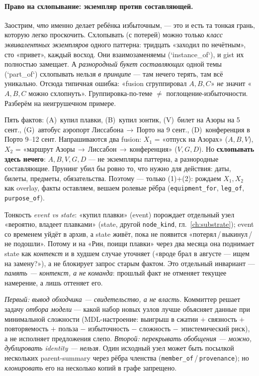 \paragraph{Право на схлопывание: экземпляр против составляющей.} Заострим, \emph{что}
именно делает ребёнка избыточным, — это и есть та тонкая грань, которую легко
проскочить. Схлопывать (с потерей) можно только \emph{класс эквивалентных экземпляров}
одного паттерна: тридцать «заходил по нечётным», сто «привет», каждый восход. Они
взаимозаменяемы (`instance\_of`), и gist их полностью замещает. А \emph{разнородный
букет составляющих} одной темы (`part\_of`) схлопывать нельзя \emph{в принципе} — там
нечего терять, там всё уникально. Отсюда типичная ошибка: «fusion сгруппировал
$A,B,C$» \emph{не} значит «$A,B,C$ можно схлопнуть». Группировка-по-теме $\ne$
поглощение-избыточности. Разберём на неигрушечном примере.

\begin{workedbox}
Пять фактов: (A)~купил плавки, (B)~купил зонтик, (V)~билет на Азоры на 5 сент.,
(G)~автобус аэропорт Лиссабона\,$\to$\,Порто на 9 сент., (D)~конференция в Порто
9--12 сент. Напрашиваются два fusion: $X_1$ = «отпуск на Азорах» ($A,B,V$),
$X_2$ = «маршрут Азоры\,$\to$\,Лиссабон\,$\to$\,конференция» ($V,G,D$). Но
\textbf{схлопывать здесь нечего}: $A,B,V,G,D$ — не экземпляры паттерна, а разнородные
составляющие. Прунинг убил бы ровно то, что нужно для действия: даты, билеты,
предметы, обязательства. Поэтому — только (1)+(2): рождаем $X_1,X_2$ как overlay,
факты оставляем, вешаем ролевые рёбра (\texttt{equipment\_for}, \texttt{leg\_of},
\texttt{purpose\_of}).

Тонкость \emph{event vs state}: «купил плавки» (event) порождает отдельный узел «вероятно,
владеет плавками» (state, другой \texttt{node\_kind}, гл.~\ref{ch:substrate}); event со
временем уйдёт в архив, а state живёт, пока не появится «потерял\,/\,выкинул\,/\,не
подошли». Потому и на «Рин, поищи плавки» через два месяца она поднимает state как
\emph{контекст} и в худшем случае уточняет («вроде брал в августе — ищем на замену?»),
а не блокирует запрос старым фактом. Это отдельный инвариант — \emph{память — контекст,
а не команда}: прошлый факт не отменяет текущее намерение, а лишь оттеняет его.
\end{workedbox}

\begin{principle}
\emph{Первый: вывод обходчика — свидетельство, а не власть.} Коммиттер решает задачу
\emph{отбора модели} — какой набор новых узлов лучше объясняет данные при минимальной
сложности (MDL-настроение: выигрыш в сжатии $+$ связность $+$ повторяемость $+$ польза
$-$ избыточность $-$ сложность $-$ эпистемический риск), а не исполняет предложения
слепо. \emph{Второй: перекрывать обобщения — можно, дублировать identity — нельзя.}
Один исходный узел может быть посылкой нескольких parent-summary через рёбра членства
(\texttt{member\_of}\,/\,\texttt{provenance}); но \emph{клонировать} его на несколько
копий в графе запрещено.
\end{principle}

